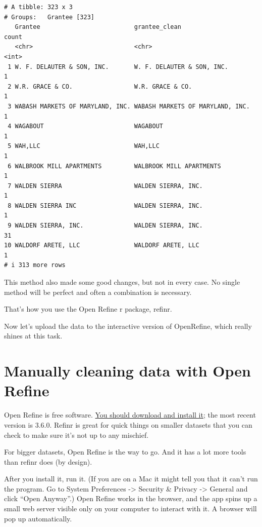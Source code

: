 \documentclass[
  letterpaper,
  DIV=11,
  numbers=noendperiod]{scrreprt}
\begin{document}
\begin{verbatim}
# A tibble: 323 x 3
# Groups:   Grantee [323]
   Grantee                          grantee_clean                    count
   <chr>                            <chr>                            <int>
 1 W. F. DELAUTER & SON, INC.       W. F. DELAUTER & SON, INC.           1
 2 W.R. GRACE & CO.                 W.R. GRACE & CO.                     1
 3 WABASH MARKETS OF MARYLAND, INC. WABASH MARKETS OF MARYLAND, INC.     1
 4 WAGABOUT                         WAGABOUT                             1
 5 WAH,LLC                          WAH,LLC                              1
 6 WALBROOK MILL APARTMENTS         WALBROOK MILL APARTMENTS             1
 7 WALDEN SIERRA                    WALDEN SIERRA, INC.                  1
 8 WALDEN SIERRA INC                WALDEN SIERRA, INC.                  1
 9 WALDEN SIERRA, INC.              WALDEN SIERRA, INC.                 31
10 WALDORF ARETE, LLC               WALDORF ARETE, LLC                   1
# i 313 more rows
\end{verbatim}

This method also made some good changes, but not in every case. No
single method will be perfect and often a combination is necessary.

That's how you use the Open Refine r package, refinr.

Now let's upload the data to the interactive version of OpenRefine,
which really shines at this task.

\hypertarget{manually-cleaning-data-with-open-refine}{%
\section{Manually cleaning data with Open
Refine}\label{manually-cleaning-data-with-open-refine}}

Open Refine is free software. \href{https://openrefine.org/}{You should
download and install it}; the most recent version is 3.6.0. Refinr is
great for quick things on smaller datasets that you can check to make
sure it's not up to any mischief.

For bigger datasets, Open Refine is the way to go. And it has a lot more
tools than refinr does (by design).

After you install it, run it. (If you are on a Mac it might tell you
that it can't run the program. Go to System Preferences -\textgreater{}
Security \& Privacy -\textgreater{} General and click ``Open Anyway''.)
Open Refine works in the browser, and the app spins up a small web
server visible only on your computer to interact with it. A browser will
pop up automatically.
\end{document}
